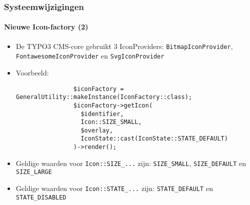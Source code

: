 \begin{frame}[fragile]
	\frametitle{Systeemwijzigingen}
	\framesubtitle{Nieuwe Icon-factory (2)}

	\lstset{basicstyle=\tiny\ttfamily}

	\begin{itemize}

		\item De TYPO3 CMS-core gebruikt 3 IconProviders:\newline
			\smaller
				\texttt{BitmapIconProvider}, \texttt{FontawesomeIconProvider} en \texttt{SvgIconProvider}
			\normalsize

		\item Voorbeeld:

			\begin{lstlisting}
				$iconFactory = GeneralUtility::makeInstance(IconFactory::class);
				$iconFactory->getIcon(
				  $identifier,
				  Icon::SIZE_SMALL,
				  $overlay,
				  IconState::cast(IconState::STATE_DEFAULT)
				)->render();
			\end{lstlisting}

		\item Geldige waarden voor \texttt{Icon::SIZE\_...} zijn:\newline
			\small\texttt{SIZE\_SMALL}, \texttt{SIZE\_DEFAULT} en \texttt{SIZE\_LARGE}\normalsize
			\vspace{0.4cm}

		\item Geldige waarden voor \texttt{Icon::STATE\_...} zijn:\newline
			\small\texttt{STATE\_DEFAULT} en \texttt{STATE\_DISABLED}\normalsize

	\end{itemize}

\end{frame}


